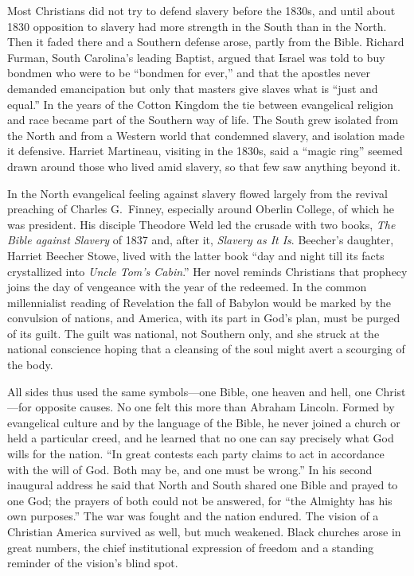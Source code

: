 Most Christians did not try to defend slavery before the 1830s, and until about 1830 opposition to slavery had more strength in the South than in the North. Then it faded
there and a Southern defense arose, partly from the Bible. Richard Furman, South Carolina's leading
Baptist, argued that Israel was told to buy bondmen who were to be ``bondmen for ever,'' and that the
apostles never demanded emancipation but only that masters give slaves what is ``just and equal.''
In the years of the Cotton Kingdom the tie between evangelical religion and race became part of the
Southern way of life. The South grew isolated from the North and from a Western world that condemned
slavery, and isolation made it defensive. Harriet Martineau, visiting in the 1830s, said a ``magic
ring'' seemed drawn around those who lived amid slavery, so that few saw anything beyond it.

In the North evangelical feeling against slavery flowed largely from the revival preaching of
Charles G.~Finney, especially around Oberlin College, of which he was president. His disciple
Theodore Weld led the crusade with two books, \emph{The Bible against Slavery} of 1837 and, after it, \emph{Slavery as It
Is}. Beecher's daughter, Harriet Beecher Stowe, lived with the latter book ``day and night till its
facts crystallized into \emph{Uncle Tom's Cabin}.'' Her novel reminds Christians that prophecy joins
the day of vengeance with the year of the redeemed. In the common millennialist reading of
Revelation the fall of Babylon would be marked by the convulsion of nations, and America, with its
part in God's plan, must be purged of its guilt. The guilt was national, not Southern only, and she
struck at the national conscience hoping that a cleansing of the soul might avert a scourging of the
body.

All sides thus used the same symbols---one Bible, one heaven and hell, one Christ---for opposite
causes. No one felt this more than Abraham Lincoln. Formed by evangelical culture and by the language
of the Bible, he never joined a church or held a particular creed, and he learned that no one can say
precisely what God wills for the nation. ``In great contests each party claims to act in accordance
with the will of God. Both may be, and one must be wrong.'' In his second inaugural address he said
that North and South shared one Bible and prayed to one God; the prayers of both could not be
answered, for ``the Almighty has his own purposes.'' The war was fought and the nation endured. The
vision of a Christian America survived as well, but much weakened. Black churches arose in great
numbers, the chief institutional expression of freedom and a standing reminder of the vision's blind
spot.

